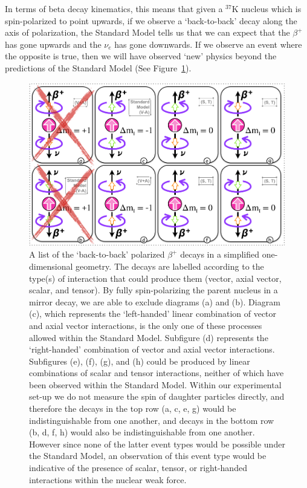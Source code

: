 In terms of beta decay kinematics, this means that given a $^{37}\textrm{K}$ nucleus which is spin-polarized to point upwards, if we observe a `back-to-back' decay along the axis of polarization, the Standard Model tells us that we can expect that the $\beta^+$ has gone upwards and the $\nu_e$ has gone downwards.  If we observe an event where the opposite is true, then we will have observed `new' physics beyond the predictions of the Standard Model (See Figure~\ref{fig:rhc}).  

\begin{figure}[h!t]
	\centering
	\includegraphics[width=.999\linewidth]
	{Figures/RHC_verbose2.png}
	\caption{ A list of the `back-to-back' polarized $\beta^+$ decays in a simplified one-dimensional geometry.  The decays are labelled according to the type(s) of interaction that could produce them (vector, axial vector, scalar, and tensor).  By fully spin-polarizing the parent nucleus in a mirror decay, we are able to exclude diagrams (a) and (b).  Diagram (c), which represents the `left-handed' linear combination of vector and axial vector interactions, is the only one of these processes allowed within the Standard Model. Subfigure (d) represents the `right-handed' combination of vector and axial vector interactions.  Subfigures (e), (f), (g), and (h) could be produced by linear combinations of scalar and tensor interactions, neither of which have been observed within the Standard Model.  
Within our experimental set-up we do not measure the spin of daughter particles directly, and therefore the decays in the top row (a, c, e, g) would be indistinguishable from one another, and decays in the bottom row (b, d, f, h) would also be indistinguishable from one another.  However since none of the latter event types would be possible under the Standard Model, an observation of this event type would be indicative of the presence of scalar, tensor, or right-handed interactions within the nuclear weak force. 
}	
	\label{fig:rhc}
\end{figure}

